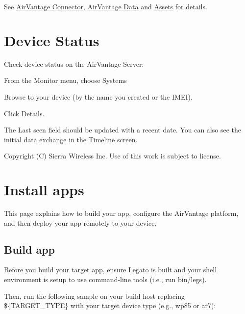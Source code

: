 See \hyperlink{c_le_avc}{Air\+Vantage Connector}, \hyperlink{c_le_avdata}{Air\+Vantage Data} and \hyperlink{def_files_cdef_defFilesCdef_assets}{Assets} for details.\hypertarget{how_to_a_v_connect_connectingAirVantage_checkDeviceStatus}{}\section{Device Status}\label{how_to_a_v_connect_connectingAirVantage_checkDeviceStatus}
Check device status on the Air\+Vantage Server\+:


\begin{DoxyItemize}
\item From the {\ttfamily Monitor} menu, choose {\ttfamily Systems}
\item Browse to your device (by the name you created or the I\+M\+E\+I).
\item Click Details.
\end{DoxyItemize}

The {\ttfamily Last seen} field should be updated with a recent date. You can also see the initial data exchange in the Timeline screen.





Copyright (C) Sierra Wireless Inc. Use of this work is subject to license. \hypertarget{appInstallAirVantage}{}\section{Install apps}\label{appInstallAirVantage}
This page explains how to build your app, configure the Air\+Vantage platform, and then deploy your app remotely to your device.\hypertarget{how_to_a_v_install_app_appInstallAirVantage_buildapp}{}\subsection{Build app}\label{how_to_a_v_install_app_appInstallAirVantage_buildapp}
Before you build your target app, ensure Legato is built and your shell environment is setup to use command-\/line tools (i.\+e., run {\ttfamily bin/legs}).

Then, run the following sample on your build host replacing {\ttfamily \$\{T\+A\+R\+G\+E\+T\+\_\+\+T\+Y\+P\+E\}} with your target device type (e.\+g., {\ttfamily wp85} or {\ttfamily ar7})\+:



